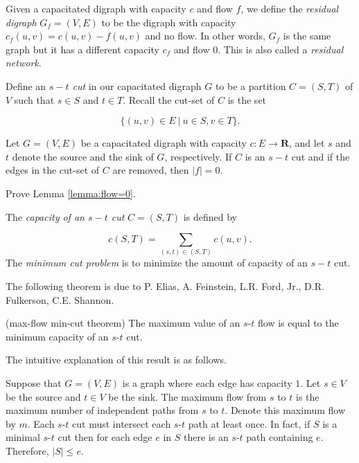Given a capacitated digraph with capacity $c$ and flow $f$,
we define the {\it residual digraph} $G_f=(V,E)$ to be the
digraph with capacity $c_f(u,v) = c(u,v) - f(u,v)$ and no flow.
In other words, $G_f$ is the same graph but it has a different
capacity $c_f$ and flow $0$.
This is also called a {\it residual network}.

Define an {\it $s-t$ cut} in our capacitated digraph $G$
to be a partition $C = (S,T)$ of $V$ such that
$s \in S$ and $t\in T$.
Recall the cut-set of $C$ is the set

\[
\{(u,v)\in E\ |\ u\in S, v\in T\}.
\]

\begin{lemma}
\label{lemma:flow=0}
{\rm
Let $G = (V, E)$ be a capacitated digraph with
capacity $c: E \to {\mathbf{R}}$, and let
$s$ and $t$ denote the source and the sink of $G$, respectively.
If $C$ is an $s-t$ cut and if
the edges in the cut-set of $C$ are removed, then $| f | = 0$.
}
\end{lemma}

\begin{exercise}
Prove Lemma \ref{lemma:flow=0}.
\end{exercise}

The {\it capacity of an $s-t$ cut}
$C = (S,T)$ is defined by

\[
c(S,T) = \sum_{(s,t)\in (S,T)} c(u,v).
\]
The {\it minimum cut problem}
is to minimize the amount of capacity of an $s-t$ cut.

The following theorem is due to P. Elias, A. Feinstein, L.R. Ford,
Jr.,  D.R. Fulkerson, C.E. Shannon.

\begin{theorem}
(max-flow min-cut theorem)
{\rm
The maximum value of an $s$-$t$ flow is equal to the minimum capacity of
an $s$-$t$ cut.
}
\end{theorem}

The intuitive explanation of this result is as follows.

Suppose that $G=(V,E)$ is a graph where each edge has capacity $1$.
Let $s\in V$ be the source and $t\in V$ be the sink.
The maximum flow from $s$ to $t$ is the maximum number of
independent paths from $s$ to $t$.
Denote this maximum flow by $m$.
Each $s$-$t$ cut must intersect each $s$-$t$ path at least once.
In fact, if $S$ is a minimal $s$-$t$ cut then for each
edge $e$ in $S$ there is an $s$-$t$ path containing
$e$. Therefore, $|S|\leq e$.

